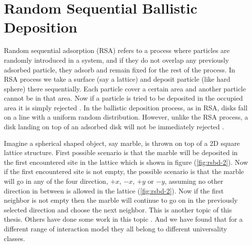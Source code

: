 		
		

\section{Random Sequential Ballistic Deposition}

	Random sequential adsorption (RSA) refers to a process where particles are randomly introduced in a system, and if they do not overlap any previously adsorbed particle, they adsorb and remain fixed for the rest of the process.	In RSA process we take a surface (say a lattice) and deposit particle (like hard sphere) there sequentially. Each particle cover a certain area and another particle cannot be in that area. Now if a particle is tried to be deposited in the occupied area it is simply rejected \cite{Renyi1958, Widom1966}.	In the ballistic deposition process, as in RSA, disks fall	on a line with a uniform random distribution. However,	unlike the RSA process, a disk landing on top of an adsorbed disk will not be immediately rejected \cite{Talbot1992}.

	Imagine a spherical shaped object, say marble, is thrown on top of a 2D square lattice structure. First possible scenario is that the marble will be deposited in the first encountered site in the lattice which is shown in figure (\ref{fig:rsbd-2}). Now if the first encountered site is not empty, the possible scenario is that the marble will go in any of the four direction, $+x$, $-x$, $+y$ or $-y$, assuming no other direction in between is allowed in the lattice (\ref{fig:rsbd-2}).  Now if the first neighbor is not empty then the marble will continue to go on in the previously selected direction and choose the next neighbor. This is another topic of this thesis. Others have done some work in this topic \cite{Choi1995, Talbot1992, Jullien1992, Viot1993}. And we have found that for a different range of interaction model they all belong to different universality classes.
	


